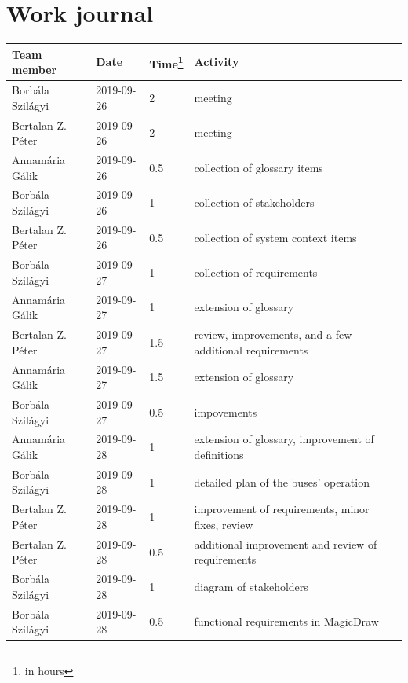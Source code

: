 \documentclass[a4paper]{article}
\begin{document}
\section{Work journal}

\begin{tabularx}{\textwidth}{l l l X}
	\toprule
	Team member & Date & Time\footnote{in hours} & Activity \\ \midrule

	Borbála Szilágyi  & 2019-09-26 & 2   & meeting \\
	Bertalan Z. Péter & 2019-09-26 & 2   & meeting \\
	Annamária Gálik   & 2019-09-26 & 0.5 & collection of glossary items \\
	Borbála Szilágyi  & 2019-09-26 & 1   & collection of stakeholders \\
	Bertalan Z. Péter & 2019-09-26 & 0.5 & collection of system context
	                                       items \\
	Borbála Szilágyi  & 2019-09-27 & 1   & collection of requirements \\
	Annamária Gálik   & 2019-09-27 & 1   & extension of glossary \\
	Bertalan Z. Péter & 2019-09-27 & 1.5 & review, improvements, and a few
	                                       additional requirements \\
	Annamária Gálik   & 2019-09-27 & 1.5 & extension of glossary \\
	Borbála Szilágyi  & 2019-09-27 & 0.5 & impovements \\
	Annamária Gálik   & 2019-09-28 & 1   & extension of glossary,
	                                       improvement of definitions \\
	Borbála Szilágyi  & 2019-09-28 & 1   & detailed plan of the buses'
	                                       operation \\
	Bertalan Z. Péter & 2019-09-28 & 1   & improvement of requirements,
	                                       minor fixes, review \\
	Bertalan Z. Péter & 2019-09-28 & 0.5 & additional improvement and review
	                                       of requirements \\
	Borbála Szilágyi  & 2019-09-28 & 1   & diagram of stakeholders \\
	Borbála Szilágyi  & 2019-09-28 & 0.5 & functional requirements in
	                                       MagicDraw \\

\end{tabularx}
\end{document}
